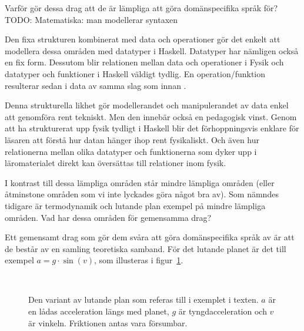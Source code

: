 \begin{binge}
Varför gör dessa drag att de är lämpliga att göra domänspecifika språk för?
TODO: Matematiska: man modellerar syntaxen

Den fixa strukturen kombinerat med data och operationer gör det enkelt att
modellera dessa områden med datatyper i Haskell. Datatyper har nämligen också en
fix form. Dessutom blir relationen mellan data och operationer i Fysik och
datatyper och funktioner i Haskell väldigt tydlig. En operation/funktion
resulterar sedan i data av samma slag som innan .

Denna strukturella likhet gör modellerandet och manipulerandet av data enkel att
genomföra rent tekniskt. Men den innebär också en pedagogisk vinst. Genom att ha
strukturerat upp fysik tydligt i Haskell blir det förhoppningsvis enklare för
läsaren att förstå hur datan hänger ihop rent fysikaliskt. Och även hur
relationerna mellan olika datatyper och funktionerna som dyker upp i
läromaterialet direkt kan översättas till relationer inom fysik.

I kontrast till dessa lämpliga områden står mindre lämpliga områden (eller
åtminstone områden som vi inte lyckades göra något bra av). Som nämndes tidigare
är termodynamik och lutande plan exempel på mindre lämpliga områden. Vad har
dessa områden för gemensamma drag?

Ett gemensamt drag som gör dem svåra att göra domänspecifika språk av är att de
består av en samling teoretiska samband. För det lutande planet är det till
exempel $a = g \cdot \sin(v)$, som illusteras i figur~\ref{fig:lutande_plan}.

\begin{figure}[tph]
  \caption{Den variant av lutande plan som referas till i exemplet i texten. $a$
  är en lådas acceleration längs med planet, $g$ är tyngdacceleration och $v$ är
  vinkeln. Friktionen antas vara försumbar.}~\label{fig:lutande_plan}
\end{figure}


\end{binge}
